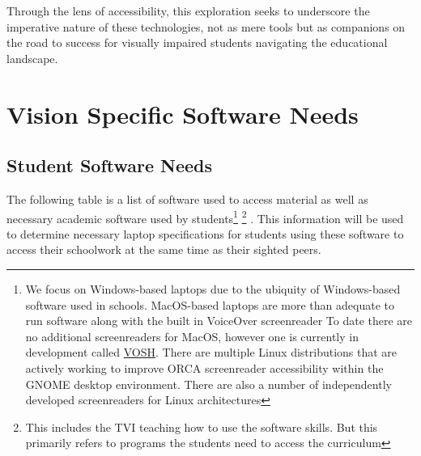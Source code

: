 \documentclass[14pt,letterpaper,twoside]{extreport}
\begin{document}
Through the lens of accessibility, this exploration seeks to underscore the imperative nature of these technologies, not as mere tools but as companions on the road to success for visually impaired students navigating the educational landscape.

\hypertarget{software-needs}{\section{Vision Specific Software Needs}\label{software-needs}}
\hypertarget{student-software-needs}{\subsection{Student Software Needs}\label{student-software-needs}}
The following table is a list of software used to access material as well as necessary academic software used by students\footnote{We focus on Windows-based laptops due to the ubiquity of Windows-based software used in schools. MacOS-based laptops are more than adequate to run software along with the built in VoiceOver screenreader  To date there are no additional screenreaders for MacOS, however one is currently in development called \href{https://youtu.be/qTkS-zNzF88?si=3XTXtbyOWD9kvwlk}{VOSH}. There are multiple Linux distributions that are actively working to improve ORCA screenreader accessibility within the GNOME desktop environment. There are also a number of independently developed screenreaders for Linux architectures} \footnote{This includes the TVI teaching how to use the software skills. But this primarily refers to programs the students need to access the curriculum} . This information will be used to determine necessary laptop specifications for students using these software to access their schoolwork at the same time as their sighted peers. 
\end{document}
